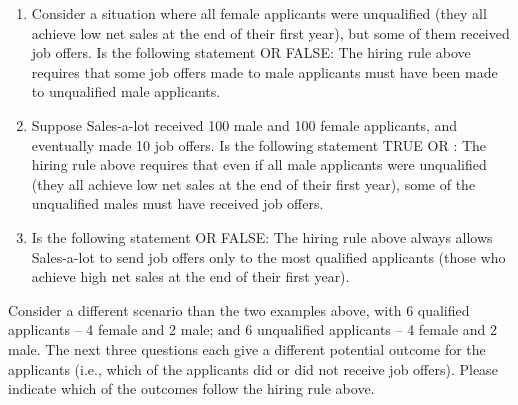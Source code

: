 \documentclass{article}
\newcommand{\correct}[1]{{\color{red}{#1}}}
\newcommand{\correct}[1]{{\color{red}{#1}}}
\begin{document}
\begin{enumerate}
\item Consider a situation where all female applicants were unqualified (they all achieve low net sales at the end of their first year), but some of them received job offers. Is the following statement \correct{TRUE} OR FALSE: The hiring rule above requires that some job offers made to male applicants must have been made to unqualified male applicants.

\item Suppose Sales-a-lot received 100 male and 100 female applicants, and eventually made 10 job offers. Is the following statement TRUE OR \correct{FALSE}: The hiring rule above requires that even if all male applicants were unqualified (they all achieve low net sales at the end of their first year), some of the unqualified males must have received job offers.

\item Is the following statement \correct{TRUE} OR FALSE: The hiring rule above always allows Sales-a-lot to send job offers only to the most qualified applicants (those who achieve high net sales at the end of their first year).

\end{enumerate}

Consider a different scenario than the two examples above, with 6 qualified applicants -- 4 female and 2 male; and 6 unqualified applicants -- 4 female and 2 male. The next three questions each give a different potential outcome for the applicants (i.e., which of the applicants did or did not receive job offers). Please indicate which of the outcomes follow the hiring rule above.
\end{document}
